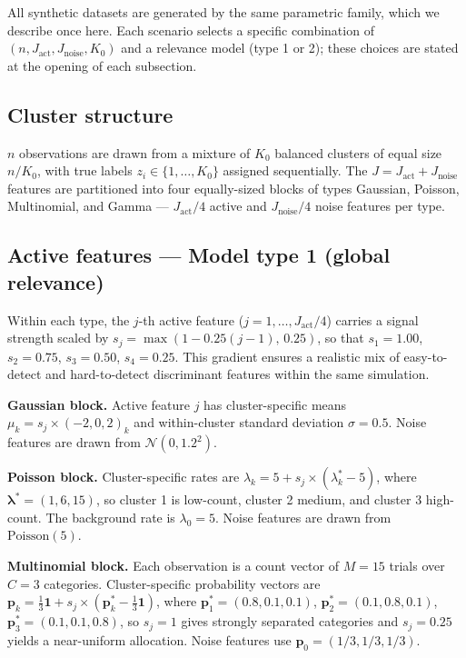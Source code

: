 \documentclass[
  letterpaper,
  DIV=11,
  numbers=noendperiod]{scrartcl}
\begin{document}
All synthetic datasets are generated by the same parametric family,
which we describe once here. Each scenario selects a specific
combination of \((n, J_{\text{act}}, J_{\text{noise}},
K_0)\) and a relevance model (type 1 or 2); these choices are stated at
the opening of each subsection.

\subsection{Cluster structure}\label{cluster-structure}

\(n\) observations are drawn from a mixture of \(K_0\) balanced clusters
of equal size \(n/K_0\), with true labels \(z_i \in \{1, \ldots, K_0\}\)
assigned sequentially. The \(J = J_{\text{act}}
+ J_{\text{noise}}\) features are partitioned into four equally-sized
blocks of types Gaussian, Poisson, Multinomial, and Gamma ---
\(J_{\text{act}}/4\) active and \(J_{\text{noise}}/4\) noise features
per type.

\subsection{Active features --- Model type 1 (global
relevance)}\label{active-features-model-type-1-global-relevance}

Within each type, the \(j\)-th active feature
(\(j = 1, \ldots, J_{\text{act}}/4\)) carries a signal strength scaled
by \(s_j = \max(1 - 0.25(j-1),\, 0.25)\), so that \(s_1 = 1.00\),
\(s_2 = 0.75\), \(s_3 = 0.50\), \(s_4 = 0.25\). This gradient ensures a
realistic mix of easy-to-detect and hard-to-detect discriminant features
within the same simulation.

\textbf{Gaussian block.} Active feature \(j\) has cluster-specific means
\(\mu_k = s_j \times (-2, 0, 2)_k\) and within-cluster standard
deviation \(\sigma = 0.5\). Noise features are drawn from
\(\mathcal{N}(0, 1.2^2)\).

\textbf{Poisson block.} Cluster-specific rates are
\(\lambda_k = 5 + s_j \times (\lambda^*_k - 5)\), where
\(\bm{\lambda}^* = (1, 6, 15)\), so cluster 1 is low-count, cluster 2
medium, and cluster 3 high-count. The background rate is
\(\lambda_0 = 5\). Noise features are drawn from
\(\mathrm{Poisson}(5)\).

\textbf{Multinomial block.} Each observation is a count vector of
\(M = 15\) trials over \(C = 3\) categories. Cluster-specific
probability vectors are
\(\bm{p}_k = \tfrac{1}{3}\bm{1} + s_j \times (\bm{p}^*_k - \tfrac{1}{3}\bm{1})\),
where \(\bm{p}^*_1 = (0.8, 0.1, 0.1)\),
\(\bm{p}^*_2 = (0.1, 0.8, 0.1)\), \(\bm{p}^*_3 = (0.1, 0.1, 0.8)\), so
\(s_j = 1\) gives strongly separated categories and \(s_j = 0.25\)
yields a near-uniform allocation. Noise features use
\(\bm{p}_0 = (1/3, 1/3, 1/3)\).
\end{document}
